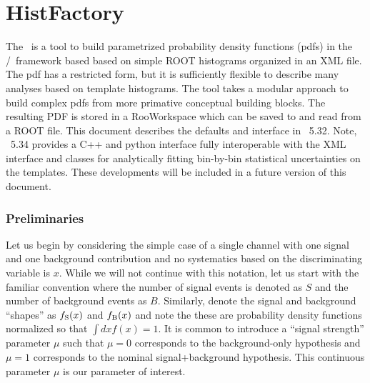 

\section{HistFactory}

The \HF\ is a tool to build parametrized probability density functions (pdfs) in the \RooFit/\RooStats\ framework based based on simple ROOT histograms organized in an XML file.  The pdf has a restricted form, but it is sufficiently flexible to describe many analyses based on template histograms. The tool takes a modular approach to build complex pdfs from more primative conceptual building blocks.  The resulting PDF is stored in a RooWorkspace which can be saved to and read from a ROOT file.  This document describes the defaults and interface in \ROOT\ 5.32.  Note, \ROOT\ 5.34 provides a C++ and python interface fully interoperable with the XML interface and classes for analytically fitting bin-by-bin statistical uncertainties on the templates.  These developments will be included in a future version of this document.

\subsubsection{Preliminaries}

Let us begin by considering the simple case of a single channel with one signal and one background contribution and no systematics based on the discriminating variable is $x$.  While we will not continue with this notation, let us start with the familiar convention where the number of signal events is denoted as $S$ and the number of background events as $B$.  Similarly, denote the signal and background ``shapes'' as $f_{\rm S}(x)$ and $f_{\rm B}(x)$ and note the these are probability density functions normalized so that $\int dx f(x)=1$.  It is common to introduce a ``signal strength'' parameter $\mu$ such that $\mu=0$ corresponds to the background-only hypothesis  and $\mu=1$ corresponds to the nominal signal+background hypothesis.  This continuous parameter $\mu$ is our parameter of interest.

